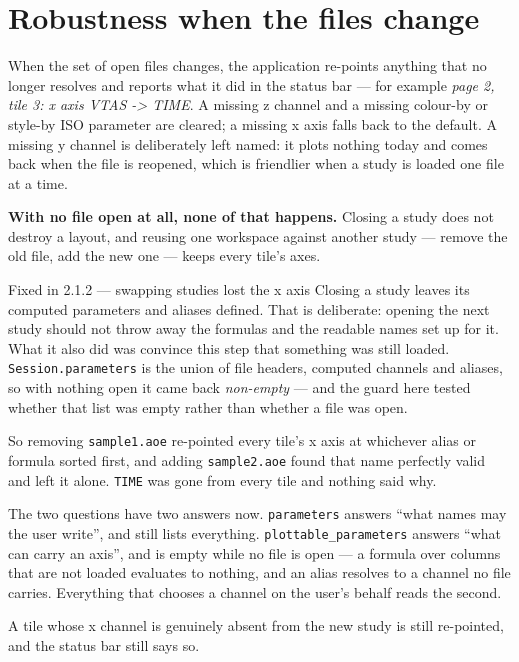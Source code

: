 \documentclass[11pt,a4paper,oneside]{report}
\newcommand{\appver}{2.1.2}
\newcommand{\code}[1]{\texttt{#1}}
\begin{document}
\section{Robustness when the files change}
\label{sec:swap}

When the set of open files changes, the application re-points anything that no
longer resolves and reports what it did in the status bar --- for example
\emph{page 2, tile 3: x axis VTAS -> TIME}. A missing z channel and a missing
colour-by or style-by ISO parameter are cleared; a missing x axis falls back to
the default. A missing y channel is deliberately left named: it plots nothing
today and comes back when the file is reopened, which is friendlier when a study
is loaded one file at a time.

\textbf{With no file open at all, none of that happens.} Closing a study does
not destroy a layout, and reusing one workspace against another study --- remove
the old file, add the new one --- keeps every tile's axes.

\begin{aoenew}{Fixed in \appver{} --- swapping studies lost the x axis}
Closing a study leaves its computed parameters and aliases defined. That is
deliberate: opening the next study should not throw away the formulas and the
readable names set up for it. What it also did was convince this step that
something was still loaded. \code{Session.parameters} is the union of file
headers, computed channels and aliases, so with nothing open it came back
\emph{non-empty} --- and the guard here tested whether that list was empty
rather than whether a file was open.

So removing \code{sample1.aoe} re-pointed every tile's x axis at whichever
alias or formula sorted first, and adding \code{sample2.aoe} found that name
perfectly valid and left it alone. \code{TIME} was gone from every tile and
nothing said why.

The two questions have two answers now. \code{parameters} answers ``what names
may the user write'', and still lists everything. \code{plottable\_parameters}
answers ``what can carry an axis'', and is empty while no file is open --- a
formula over columns that are not loaded evaluates to nothing, and an alias
resolves to a channel no file carries. Everything that chooses a channel on the
user's behalf reads the second.
\end{aoenew}

A tile whose x channel is genuinely absent from the new study is still
re-pointed, and the status bar still says so.
\end{document}
